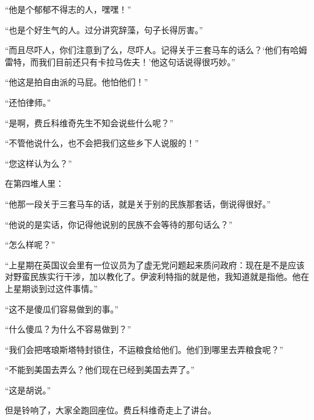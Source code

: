 \par “他是个郁郁不得志的人，嘿嘿！”
\par “也是个好生气的人。过分讲究辞藻，句子长得厉害。”
\par “而且尽吓人，你们注意到了么，尽吓人。记得关于三套马车的话么？‘他们有哈姆雷特，而我们目前还只有卡拉马佐夫！’他这句话说得很巧妙。”
\par “他这是拍自由派的马屁。他怕他们！”
\par “还怕律师。”
\par “是啊，费丘科维奇先生不知会说些什么呢？”
\par “不管他说什么，也不会把我们这些乡下人说服的！”
\par “您这样认为么？”
\par 在第四堆人里：
\par “他那一段关于三套马车的话，就是关于别的民族那套话，倒说得很好。”
\par “他说的是实话，你记得他说别的民族不会等待的那句话么？”
\par “怎么样呢？”
\par “上星期在英国议会里有一位议员为了虚无党问题起来质问政府：现在是不是应该对野蛮民族实行干涉，加以教化了。伊波利特指的就是他，我知道就是指他。他在上星期谈到过这件事情。”
\par “这不是傻瓜们容易做到的事。”
\par “什么傻瓜？为什么不容易做到？”
\par “我们会把喀琅斯塔特封锁住，不运粮食给他们。他们到哪里去弄粮食呢？”
\par “不能到美国去弄么？他们现在已经到美国去弄了。”
\par “这是胡说。”
\par 但是铃响了，大家全跑回座位。费丘科维奇走上了讲台。
